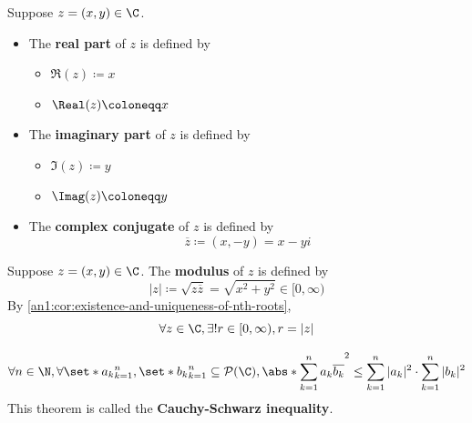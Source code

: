 \begin{definition} \label{an1:def:real-part-imaginary-part-complex-conjugate}
  Suppose $z = (x, y) \in \C$.
  \begin{itemize}
    \item The \textbf{real part} of $z$ is defined by
          \begin{itemize}
            \item $\Re(z) \coloneqq x$
            \item $\Real(z) \coloneqq x$
          \end{itemize}
    \item The \textbf{imaginary part} of $z$ is defined by
          \begin{itemize}
            \item $\Im(z) \coloneqq y$
            \item $\Imag(z) \coloneqq y$
          \end{itemize}
    \item The \textbf{complex conjugate} of $z$ is defined by
          \[
            \overline{z} \coloneqq (x, -y) = x - yi
          \]
  \end{itemize}
\end{definition}

\begin{definition} \label{an1:def:modulus}
  Suppose $z = (x, y) \in \C$. The \textbf{modulus} of $z$ is defined by
  \[
    |z| \coloneqq \sqrt{z\overline{z}} = \sqrt{x^{2} + y^{2}} \in [0, \infty)
  \]
  By \cref{an1:cor:existence-and-uniqueness-of-nth-roots},
  \[
    \forall z \in \C, \exists! r \in [0, \infty), r = |z|
  \]
\end{definition}

\begin{theorem} \label{an1:thm:cauchy-schwarz-inequality}
  \[
    \forall n \in \N, \forall \set*{a_{k}}_{k = 1}^{n}, \set*{b_{k}}_{k = 1}^{n} \subseteq \mathcal{P}(\C),
    \abs*{\sum_{k = 1}^{n} a_{k} \overline{b_{k}}}^{2} \leq
    \sum_{k = 1}^{n} |a_{k}|^{2} \cdot \sum_{k = 1}^{n} |b_{k}|^{2}
  \]
  This theorem is called the \textbf{Cauchy-Schwarz inequality}.
\end{theorem}

